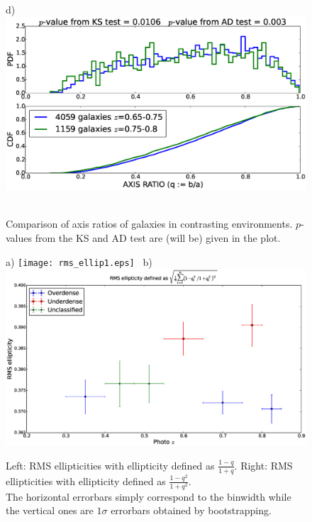 \documentclass[twocolumn,useAMS,usenatbib]{mn2e}
\begin{document}
\begin{figure}
 d) \includegraphics[width=0.9\columnwidth]{axisratio(0)_0dot65-0dot75_0dot75-0dot80.eps} \
 \caption{Comparison of axis ratios of galaxies in contrasting environments. $p$-values from the KS and AD test are (will be) given in the plot.}
 \label{fig:axisratio_contrasting}
\end{figure}


\begin{figure}
 \centering
 a) \texttt{[image: rms\_ellip1.eps]} \
 b) \includegraphics[width=0.9\columnwidth]{rms_ellip2_noevolution.eps} \\
 \caption{Left: RMS ellipticities with ellipticity defined as $\frac{1-q}{1+q}$. \; 
          Right: RMS ellipticities with ellipticity defined as $\frac{1-q^2}{1+q^2}$.\\ The horizontal errorbars simply correspond to the binwidth while the vertical ones
          are $1\sigma$ errorbars obtained by bootstrapping.}
 \label{fig:rms_ellip}
\end{figure}
\end{document}
